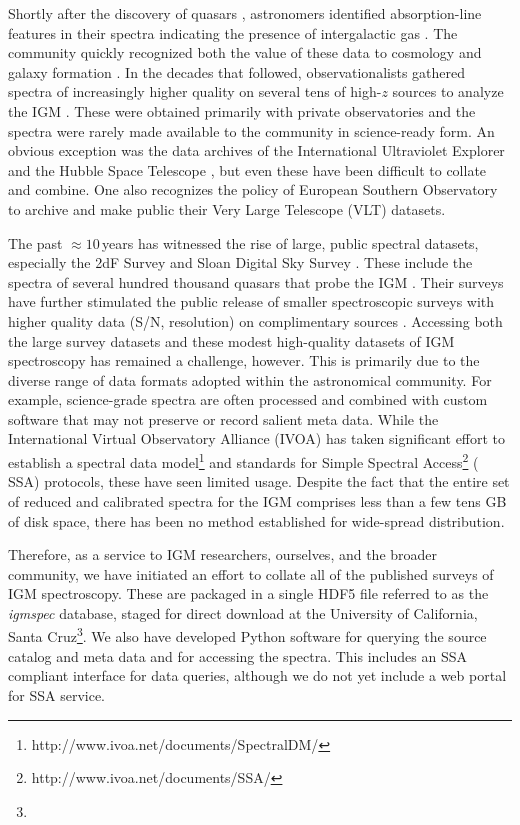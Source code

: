 \documentclass[12pt]{elsarticle}
\begin{document}
Shortly after the discovery of quasars \cite{schmidt63},
astronomers identified absorption-line features in their 
spectra indicating the presence of intergalactic gas
\citep{bs65,blb66}.  
The community quickly recognized both the value of these
data to cosmology and galaxy formation \citep{gp65,bs69}.
In the decades that followed, observationalists gathered
spectra of increasingly higher quality on several tens of
high-$z$ sources to analyze the IGM 
\citep{sargent80,tytler82,wolfe86,lzt91}.
These were obtained primarily with private observatories and
the spectra were rarely made available
to the community in science-ready form.
An obvious exception was the data archives of the
International Ultraviolet Explorer
and the Hubble Space Telescope 
\citep[{\it HST};][]{hstkeyproj_1,bechtold02},
but even these have been difficult to  collate and combine.
One also recognizes the policy of European Southern
Observatory to archive and
make public their Very Large Telescope (VLT) datasets.

The past $\approx 10$\,years has witnessed the
rise of large, public spectral datasets, especially
the 2dF Survey and Sloan Digital Sky Survey \citep[SDSS;][]{yaa+00,croom01}.
These include the spectra of several hundred thousand quasars
that probe the IGM \citep[e.g.][]{sdss_qso_dr7}.
Their surveys have further stimulated the public release
of smaller spectroscopic surveys with higher quality
data (S/N, resolution) on complimentary sources
\citep[e.g.][]{pwh+07,prochaska+15}.
Accessing both the large survey datasets 
and these modest high-quality datasets of IGM spectroscopy
has remained a challenge, however. 
This is primarily due to the diverse range of 
data formats adopted within 
the astronomical community.
For example, science-grade spectra are often processed and combined
with custom software that may not preserve or record salient meta 
data.  While the International Virtual Observatory Alliance (IVOA)
has taken significant effort to establish a
spectral data model\footnote{http://www.ivoa.net/documents/SpectralDM/}
and  standards for Simple Spectral Access\footnote{http://www.ivoa.net/documents/SSA/} (
SSA) protocols, these have seen limited usage.
Despite the fact that the entire set of
reduced and calibrated spectra for the IGM
comprises less than a few tens GB of disk space,
there has been no method established for
wide-spread distribution.

Therefore, as a service to IGM researchers, ourselves, and the
broader community, we have initiated an effort to collate 
all of the published surveys of IGM spectroscopy. 
These are packaged in a single HDF5 file referred to as
the {\it igmspec} database, staged for direct download
at the University of California, 
Santa Cruz\footnote{\weblink}.
We also have developed Python software 
for querying the source catalog and meta data
and for accessing the spectra. 
This includes an SSA compliant interface for data queries,
although we do not yet include a web portal for SSA service.
\end{document}
